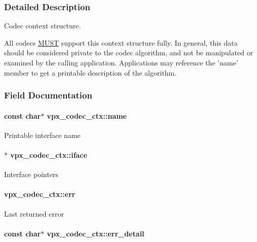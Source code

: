 \subsubsection{Detailed Description}
Codec context structure. 

All codecs \hyperlink{rfc2119_MUST}{M\+U\+S\+T} support this context structure fully. In general, this data should be considered private to the codec algorithm, and not be manipulated or examined by the calling application. Applications may reference the 'name' member to get a printable description of the algorithm. 

\subsubsection{Field Documentation}
\hypertarget{structvpx__codec__ctx_a7ed1bf8f6434ea2df01da8011849c6cb}{
\paragraph[{name}]{\setlength{\rightskip}{0pt plus 5cm}const char$\ast$ vpx\+\_\+codec\+\_\+ctx\+::name}}\label{structvpx__codec__ctx_a7ed1bf8f6434ea2df01da8011849c6cb}
Printable interface name \hypertarget{structvpx__codec__ctx_af5986790e3420beda77f3a9b64f6b953}{
\paragraph[{iface}]{$\ast$ vpx\+\_\+codec\+\_\+ctx\+::iface}}\label{structvpx__codec__ctx_af5986790e3420beda77f3a9b64f6b953}
Interface pointers \hypertarget{structvpx__codec__ctx_a6f448802b0675013fd8c5179675c30de}{
\paragraph[{err}]{ vpx\+\_\+codec\+\_\+ctx\+::err}}\label{structvpx__codec__ctx_a6f448802b0675013fd8c5179675c30de}
Last returned error \hypertarget{structvpx__codec__ctx_ad785c88ae862dd9129965c72723260bd}{
\paragraph[{err\+\_\+detail}]{\setlength{\rightskip}{0pt plus 5cm}const char$\ast$ vpx\+\_\+codec\+\_\+ctx\+::err\+\_\+detail}}\label{structvpx__codec__ctx_ad785c88ae862dd9129965c72723260bd}
